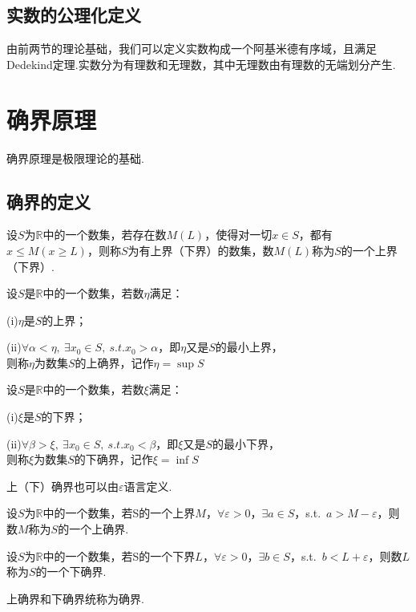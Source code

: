 \subsection{实数的公理化定义}
由前两节的理论基础，我们可以定义{\heiti 实数}构成一个阿基米德有序域，且满足Dedekind定理.实数分为有理数和无理数，其中无理数由有理数的无端划分产生.
\section{确界原理}
确界原理是极限理论的基础.
\subsection{确界的定义}
\begin{definition}
	设$S$为$\mathbb{R}$中的一个数集，若存在数$M(L)$，使得对一切$x\in S$，都有$x\leqslant M(x\geqslant L)$，则称$S$为{\heiti 有上界（下界）的数集}，数$M(L)$称为$S$的一个{\heiti 上界（下界）}.
\end{definition}
\begin{definition}[上确界]
	设$S$是$\mathbb{R}$中的一个数集，若数$\eta$满足：
	
	(i)$\eta$是$S$的上界；
	
	(ii)$\forall \alpha < \eta,\ \exists x_0\in S,\ s.t.x_0>\alpha$，即$\eta$又是$S$的最小上界，\\
	则称$\eta$为数集$S$的{\heiti 上确界}，记作$\eta=\sup S$
\end{definition}
\begin{definition}[下确界]
	设$S$是$\mathbb{R}$中的一个数集，若数$\xi$满足：
	
	(i)$\xi$是$S$的下界；
	
	(ii)$\forall \beta > \xi,\ \exists x_0\in S,\ s.t.x_0<\beta$，即$\xi$又是$S$的最小下界，\\
	则称$\xi$为数集$S$的{\heiti 下确界}，记作$\xi=\inf S$
\end{definition}
上（下）确界也可以由$\varepsilon$语言定义.
\begin{definition}
	设$S$为$\mathbb{R}$中的一个数集，若S的一个上界$M$，$\forall \varepsilon>0$，$\exists a\in S$，s.t.\ $a>M-\varepsilon$，则数$M$称为$S$的一个{\heiti 上确界}.
\end{definition}
\begin{definition}
	设$S$为$\mathbb{R}$中的一个数集，若S的一个下界$L$，$\forall \varepsilon>0$，$\exists b\in S$，s.t.\ $b<L+\varepsilon$，则数$L$称为$S$的一个{\heiti 下确界}.
\end{definition}
上确界和下确界统称为确界.

